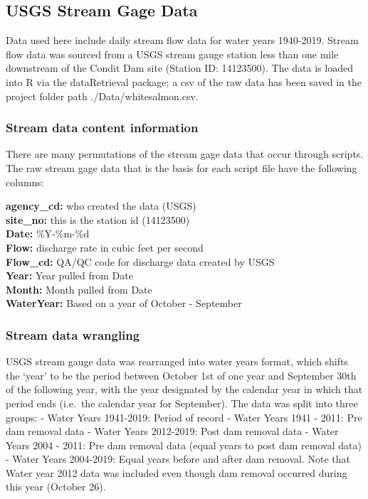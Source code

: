 \documentclass[
  12pt,
]{article}
\begin{document}
\hypertarget{usgs-stream-gage-data}{%
\subsection{USGS Stream Gage Data}\label{usgs-stream-gage-data}}

Data used here include daily stream flow data for water years 1940-2019.
Stream flow data was sourced from a USGS stream gauge station less than
one mile downstream of the Condit Dam site (Station ID: 14123500). The
data is loaded into R via the dataRetrieval package; a csv of the raw
data has been saved in the project folder path ./Data/whitesalmon.csv.

\hypertarget{stream-data-content-information}{%
\subsubsection{Stream data content
information}\label{stream-data-content-information}}

There are many permutations of the stream gage data that occur through
scripts. The raw stream gage data that is the basis for each script file
have the following columns:

\textbf{agency\_cd:} who created the data (USGS)\\
\textbf{site\_no:} this is the station id (14123500)\\
\textbf{Date:} \%Y-\%m-\%d\\
\textbf{Flow:} discharge rate in cubic feet per second\\
\textbf{Flow\_cd:} QA/QC code for discharge data created by USGS\\
\textbf{Year:} Year pulled from Date\\
\textbf{Month:} Month pulled from Date\\
\textbf{WaterYear:} Based on a year of October - September

\hypertarget{stream-data-wrangling}{%
\subsubsection{Stream data wrangling}\label{stream-data-wrangling}}

USGS stream gauge data was rearranged into water years format, which
shifts the `year' to be the period between October 1st of one year and
September 30th of the following year, with the year designated by the
calendar year in which that period ends (i.e.~the calendar year for
September). The data was split into three groups: - Water Years
1941-2019: Period of record - Water Years 1941 - 2011: Pre dam removal
data - Water Years 2012-2019: Post dam removal data - Water Years 2004 -
2011: Pre dam removal data (equal years to post dam removal data) -
Water Years 2004-2019: Equal years before and after dam removal. Note
that Water year 2012 data was included even though dam removal occurred
during this year (October 26).
\end{document}
